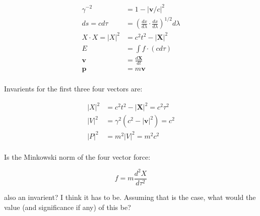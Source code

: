 \documentclass{article}      %
\begin{document}
\begin{align*}
\gamma^{-2} &= 1 - {\lvert \mathbf{v}/c \rvert}^2 \\
ds = c d\tau &= {\left(\frac{dx}{d\lambda} \cdot \frac{dx}{d\lambda}\right)}^{1/2} d\lambda \\
X \cdot X = {\lvert X \rvert}^2 &= c^2t^2 - {\lvert \mathbf{X} \rvert}^2 \\
E &= \int f \cdot (c d\tau) \\
\mathbf{v} &= \frac{d\mathbf{X}}{dt} \\
\mathbf{p} &= m\mathbf{v} \\
\end{align*}

Invarients for the first three four vectors are:

\begin{align*}
{\lvert X \rvert}^2 &= c^2 t^2 - {\lvert \mathbf{X} \rvert}^2 = c^2 \tau^2 \\
{\lvert V \rvert}^2 &= \gamma^2 (c^2 - {\lvert \mathbf{v} \rvert}^2) = c^2 \\
{\lvert P \rvert}^2 &= m^2 {\lvert V \rvert}^2 = m^2 c^2 \\
\end{align*}

Is the Minkowski norm of the four vector force:

\[
f = m\frac{d^2 X}{d\tau^2} 
\]

also an invarient?  I think it has to be.  Assuming that is the case, what would the value (and significance if any) of this be?
\end{document}

